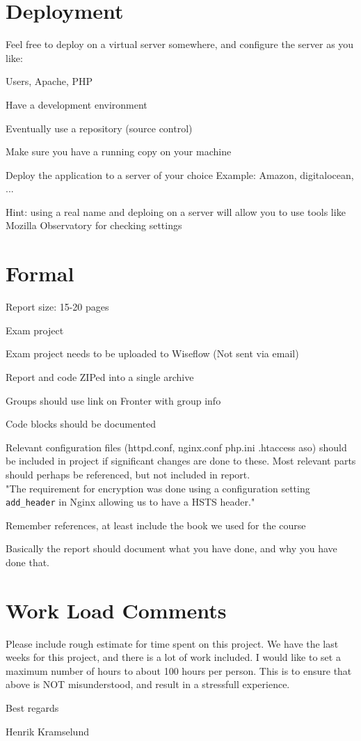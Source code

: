 \documentclass[a4paper,11pt,notitlepage]{report}
\begin{document}
\section*{Deployment}

Feel free to deploy on a virtual server somewhere, and configure the server as you like:
\begin{list2}
\item Users, Apache, PHP
\item Have a development environment
\item Eventually use a repository (source control)
\item Make sure you have a running copy on your machine
\end{list2}

Deploy the application to a server of your choice Example: Amazon, digitalocean, ...

Hint: using a real name and deploing on a server will allow you to use tools like Mozilla Observatory for checking settings 

\section*{Formal}
\begin{list2}
\item Report size: 15-20 pages
\item Exam project
\item Exam project needs to be uploaded to Wiseflow (Not sent via email)
\item Report and code ZIPed into a single archive
\item Groups should use link on Fronter with group info
\item Code blocks should be documented
\item Relevant configuration files (httpd.conf, nginx.conf php.ini .htaccess aso) should be included in project if significant changes are done to these. Most relevant parts should perhaps be referenced, but not included in report.\\ "The requirement for encryption was done using a configuration setting \verb+add_header+ in Nginx allowing us to have a HSTS header."
\item Remember references, at least include the book we used for the course
\end{list2}

Basically the report should document what you have done, and why you have done that.

\section*{Work Load Comments}

Please include rough estimate for time spent on this project. We have the last weeks for this project, and there is a lot of work included. I would like to set a maximum number of hours to about 100 hours per person. This is to ensure that above is NOT misunderstood, and result in a stressfull experience.

Best regards

Henrik Kramselund
\end{document}
